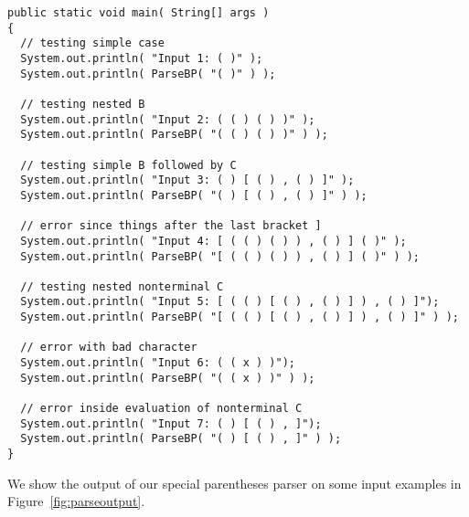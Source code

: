 {\footnotesize%
\renewcommand{\ttdefault}{pcr} %
\begin{verbatim}
public static void main( String[] args ) 
{
  // testing simple case
  System.out.println( "Input 1: ( )" );
  System.out.println( ParseBP( "( )" ) );

  // testing nested B
  System.out.println( "Input 2: ( ( ) ( ) )" );
  System.out.println( ParseBP( "( ( ) ( ) )" ) );

  // testing simple B followed by C
  System.out.println( "Input 3: ( ) [ ( ) , ( ) ]" );
  System.out.println( ParseBP( "( ) [ ( ) , ( ) ]" ) );

  // error since things after the last bracket ]
  System.out.println( "Input 4: [ ( ( ) ( ) ) , ( ) ] ( )" );
  System.out.println( ParseBP( "[ ( ( ) ( ) ) , ( ) ] ( )" ) );

  // testing nested nonterminal C
  System.out.println( "Input 5: [ ( ( ) [ ( ) , ( ) ] ) , ( ) ]");
  System.out.println( ParseBP( "[ ( ( ) [ ( ) , ( ) ] ) , ( ) ]" ) );

  // error with bad character
  System.out.println( "Input 6: ( ( x ) )"); 
  System.out.println( ParseBP( "( ( x ) )" ) ); 

  // error inside evaluation of nonterminal C
  System.out.println( "Input 7: ( ) [ ( ) , ]"); 
  System.out.println( ParseBP( "( ) [ ( ) , ]" ) ); 
}
\end{verbatim}%
}%

We show the output of our special parentheses parser on some input examples
in Figure~\ref{fig:parseoutput}.


